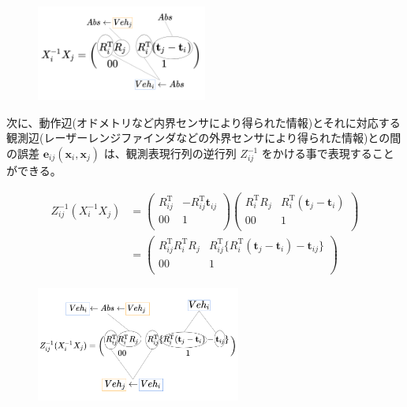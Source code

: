 \documentclass{article}
\begin{document}
\begin{figure}[h!]
  \centering
  \includegraphics[width=0.5\textwidth]{3-1_difference_between_nodes.png}
\end{figure}

次に、動作辺(オドメトリなど内界センサにより得られた情報)とそれに対応する観測辺(レーザーレンジファインダなどの外界センサにより得られた情報)との間の誤差 $\bm{e}_{ij}(\bm{x}_i, \bm{x}_j)$ は、観測表現行列の逆行列 $Z_{ij}^{-1}$ をかける事で表現することができる。

\[
\begin{align}
Z_{ij}^{-1} (X_i^{-1} X_j) &=
\left(
  \begin{array}{cc}
    R_{ij}^{\mathrm{T}} & -R_{ij}^{\mathrm{T}}\bm{t}_{ij} \\
                     00 &                                 1 \\
  \end{array}
\right)
\left(
  \begin{array}{cc}
    R_i^{\mathrm{T}}R_j & R_i^{\mathrm{T}}(\bm{t}_j-\bm{t}_i) \\
                     00 &                                       1 \\
  \end{array}
\right) \\ &=
\left(
  \begin{array}{cc}
    R_{ij}^{\mathrm{T}}R_i^{\mathrm{T}}R_j & R_{ij}^{\mathrm{T}}\{R_i^{\mathrm{T}}(\bm{t}_j-\bm{t}_i)-\bm{t}_{ij}\} \\
                                        00 &                                                                            1 \\
  \end{array}
\right)
\end{align}
\]

\begin{figure}[h!]
  \centering
  \includegraphics[width=0.6\textwidth]{3-2_error_between_edges.png}
\end{figure}
\end{document}

